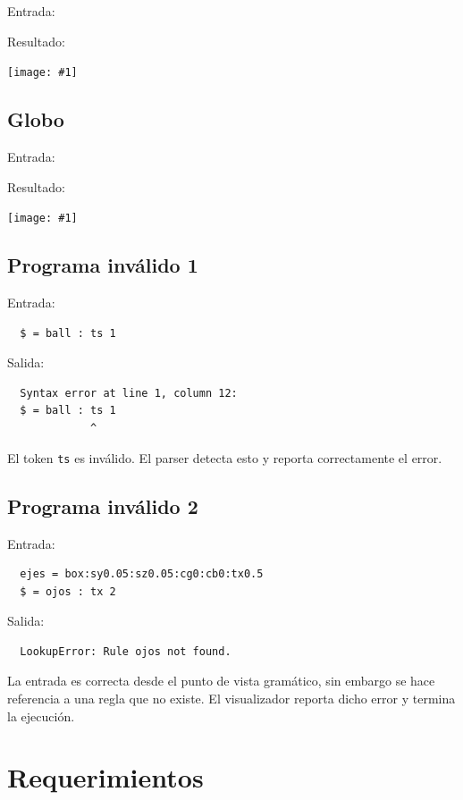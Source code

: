 \documentclass[a4paper, 10pt, twoside]{article}
\newcommand{\grafico}[1]{
  \begin{center}
    \texttt{[image: \#1]}
  \end{center}
}
\begin{document}
Entrada:



Resultado:

\grafico{dickbutt.png}


\subsection{Globo}

Entrada:



Resultado:

\grafico{ejemplo23.png}


\subsection{Programa inválido 1}

Entrada:

\begin{verbatim}
  $ = ball : ts 1
\end{verbatim}

Salida:

\begin{verbatim}
  Syntax error at line 1, column 12:
  $ = ball : ts 1
             ^
\end{verbatim}

El token \texttt{ts} es inválido. El parser detecta esto y reporta correctamente el error.


\subsection{Programa inválido 2}

Entrada:

\begin{verbatim}
  ejes = box:sy0.05:sz0.05:cg0:cb0:tx0.5
  $ = ojos : tx 2
\end{verbatim}

Salida:

\begin{verbatim}
  LookupError: Rule ojos not found.
\end{verbatim}

La entrada es correcta desde el punto de vista gramático, sin embargo se hace referencia a una regla que no existe. El visualizador reporta dicho error y termina la ejecución.


\section{Requerimientos}
\end{document}
